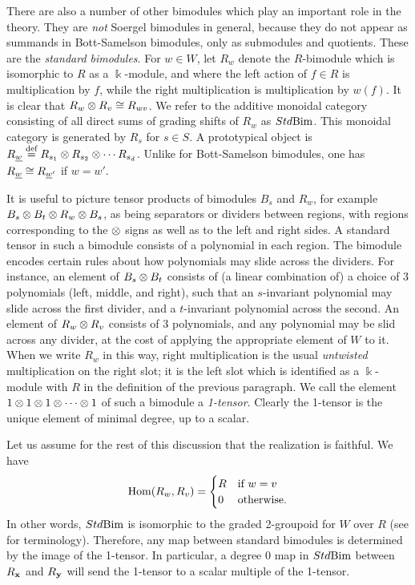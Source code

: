 There are also a number of other bimodules which play an important role in the theory. They are \emph{not} Soergel bimodules in general, because they do not appear as summands in Bott-Samelson
bimodules, only as submodules and quotients. These are the \emph{standard bimodules}. For $w \in W$, let $R_w$ denote the $R$-bimodule which is isomorphic to $R$ as a $\Bbbk$-module, and
where the left action of $f \in R$ is multiplication by $f$, while the right multiplication is multiplication by $w(f)$. It is clear that $R_w \otimes R_v \cong R_{wv}$. We refer to the
additive monoidal category consisting of all direct sums of grading shifts of $R_w$ as $Std\textrm{Bim}$. This monoidal category is generated by $R_s$ for $s \in S$. A prototypical
object is $R_{\underline{w}} \stackrel{\mbox{\scriptsize{def}}}{=} R_{s_1} \otimes R_{s_2} \otimes \cdots R_{s_d}$. Unlike for Bott-Samelson bimodules, one has $R_{\underline{w}} \cong  R_{\underline{w}'}$ if $w = w'$.

It is useful to picture tensor products of bimodules $B_s$ and $R_w$, for example $B_s \otimes B_t \otimes R_w \otimes B_s$, as being separators or dividers between regions, with regions corresponding
to the $\otimes$ signs as well as to the left and right sides. A standard tensor in such a bimodule consists of a polynomial in each region. The bimodule encodes certain rules about how
polynomials may slide across the dividers. For instance, an element of $B_s \otimes B_t$ consists of (a linear combination of) a choice of 3 polynomials (left, middle, and right), such that an
$s$-invariant polynomial may slide across the first divider, and a $t$-invariant polynomial across the second. An element of $R_w \otimes R_v$ consists of 3 polynomials, and any polynomial may
be slid across any divider, at the cost of applying the appropriate element of $W$ to it. When we write $R_w$ in this way, right multiplication is the usual \emph{untwisted} multiplication
on the right slot; it is the left slot which is identified as a $\Bbbk$-module with $R$ in the definition of the previous paragraph. We call the element $1 \otimes 1 \otimes 1 \otimes \cdots \otimes 1$ of
such a bimodule a \emph{1-tensor}. Clearly the 1-tensor is the unique element of minimal degree, up to a scalar.

Let us assume for the rest of this discussion that the realization is faithful. We have
\[
\operatorname{Hom}(R_w,R_v) = \begin{cases} R & \text{if $w = v$} \\ 0 & \text{otherwise.} \end{cases}
\]
In other words, $Std\textrm{Bim}$ is isomorphic to the graded 2-groupoid for $W$ over $R$ (see \cite{EWFenn} for terminology). Therefore, any map between standard bimodules is determined by the image of the 1-tensor.  In particular, a degree $0$ map in $Std\textrm{Bim}$ between $R_{\mathbf x}$ and $R_{\mathbf y}$ will send the 1-tensor to a scalar multiple of the 1-tensor.

